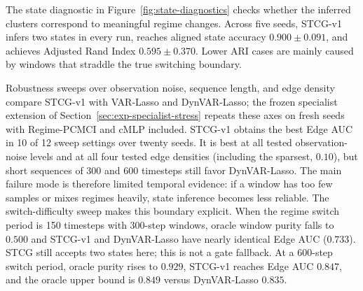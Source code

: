 \documentclass[sigconf,anonymous]{acmart}
\begin{document}
The state diagnostic in Figure~\ref{fig:state-diagnostics} checks whether the inferred clusters correspond to meaningful regime changes.
Across five seeds, STCG-v1 infers two states in every run, reaches aligned state accuracy $0.900 \pm 0.091$, and achieves Adjusted Rand Index $0.595 \pm 0.370$.
Lower ARI cases are mainly caused by windows that straddle the true switching boundary.

Robustness sweeps over observation noise, sequence length, and edge density compare STCG-v1 with VAR-Lasso and DynVAR-Lasso; the frozen specialist extension of Section~\ref{sec:exp-specialist-stress} repeats these axes on fresh seeds with Regime-PCMCI and cMLP included.
STCG-v1 obtains the best Edge AUC in 10 of 12 sweep settings over twenty seeds.
It is best at all tested observation-noise levels and at all four tested edge densities (including the sparsest, $0.10$), but short sequences of 300 and 600 timesteps still favor DynVAR-Lasso.
The main failure mode is therefore limited temporal evidence: if a window has too few samples or mixes regimes heavily, state inference becomes less reliable.
The switch-difficulty sweep makes this boundary explicit.
When the regime switch period is 150 timesteps with 300-step windows, oracle window purity falls to $0.500$ and STCG-v1 and DynVAR-Lasso have nearly identical Edge AUC ($0.733$). STCG still accepts two states here; this is not a gate fallback.
At a 600-step switch period, oracle purity rises to $0.929$, STCG-v1 reaches Edge AUC $0.847$, and the oracle upper bound is $0.849$ versus DynVAR-Lasso $0.835$.
\end{document}

